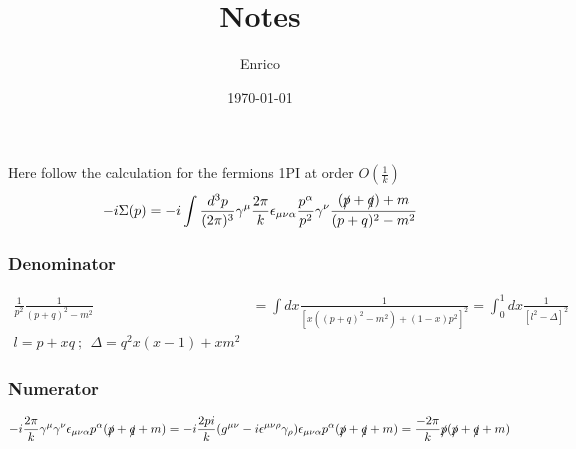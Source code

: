\documentclass[a4paper,11pt,DIV=12]{scrartcl}
\begin{document}
\title{Notes}
\author{Enrico}
\date{\today}  %

\maketitle

Here follow the calculation for the fermions 1PI at order $O(\frac{1}{k})$
\begin{equation}
    -i\Sigma(p)=-i \int \frac{d^3 p}{(2\pi)^3}\gamma^\mu \frac{2\pi}{k} \epsilon_{\mu \nu \alpha} \frac{p^\alpha}{p^2}\gamma^\nu \frac{(\slashed{p}+\slashed{q})+m}{(p+q)^2-m^2}
\end{equation}
\subsubsection*{Denominator}

\begin{align*}
    \frac{1}{p^2}\frac{1}{(p+q)^2-m^2}&= \int dx \frac{1}{[x((p+q)^2-m^2)+(1-x)p^2]^2}=\int_0^1 dx\frac{1}{[l^2-\Delta]^2}\\
    l = p +x q\ ;\ \ \Delta = q^2 x(x-1)+x m^2
\end{align*}

\subsubsection*{Numerator}
\begin{align*}
    -i\frac{2\pi}{k} \gamma^\mu \gamma^\nu \epsilon_{\mu \nu \alpha}p^\alpha (\slashed{p}+\slashed{q}+m)=-i \frac{2pi}{k}(g^{\mu \nu}-i\epsilon^{\mu \nu \rho}\gamma_\rho)\epsilon_{\mu \nu \alpha}p^\alpha(\slashed{p}+\slashed{q}+m) = \frac{-2\pi}{k}\slashed{p}(\slashed{p}+\slashed{q}+m)
\end{align*}
\end{document}
